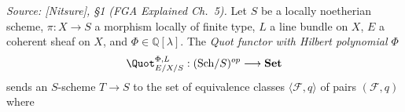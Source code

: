 \begin{definition}
  \textit{Source: [Nitsure], \S 1 (FGA Explained Ch.~5).}
  Let \(S\) be a locally noetherian scheme, \(\pi : X \to S\) a morphism
  locally of finite type,
  \(L\) a line bundle on \(X\), \(E\) a coherent sheaf on \(X\), and
  \(\Phi \in \mathbb{Q}[\lambda]\). The \emph{Quot functor with Hilbert
  polynomial \(\Phi\)}
  \[
    \Quot^{\Phi,L}_{E/X/S} : (\mathrm{Sch}/S)^{op} \longrightarrow \mathbf{Set}
  \]
  sends an \(S\)-scheme \(T \to S\) to the set of equivalence classes
  \(\langle \mathcal{F}, q\rangle\) of pairs \((\mathcal{F}, q)\) where

\end{definition}
